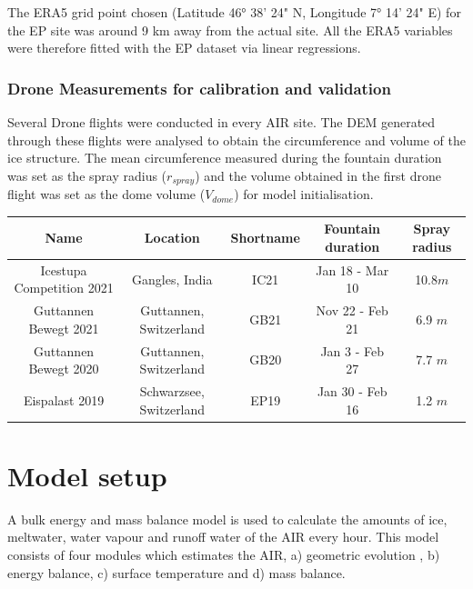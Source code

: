 \documentclass[utf8]{frontiersSCNS} %
\begin{document}
The ERA5 grid point chosen (Latitude 46° 38' 24" N, Longitude 7° 14' 24" E) for the EP site was around 9 km
away from the actual site.  All the ERA5 variables were therefore fitted with the EP dataset via linear regressions.

\subsubsection{Drone Measurements for calibration and validation} \label{section:validation} 
Several Drone flights were conducted in every AIR site. The DEM generated through these flights were analysed to obtain
the circumference and volume of the ice structure. The mean circumference measured during the fountain duration was set
as the spray radius ($r_{spray}$) and the volume obtained in the first drone flight was set as the dome
volume ($V_{dome}$) for model initialisation.

\begin{center}
 \begin{tabular}{|c| c c c c |} 
 \hline
 Name & Location & Shortname & Fountain duration & Spray radius\\ [0.5ex] 
 \hline\hline
 Icestupa Competition 2021 & Gangles, India& IC21 & Jan 18 - Mar 10 & 10.8$m$\\
 \hline
 Guttannen Bewegt 2021 & Guttannen, Switzerland & GB21 & Nov 22 - Feb 21 & 6.9 $m$\\ 
 \hline
 Guttannen Bewegt 2020 & Guttannen, Switzerland& GB20 & Jan 3 - Feb 27 & 7.7 $m$\\ 
 \hline
 Eispalast 2019 & Schwarzsee, Switzerland& EP19 & Jan 30 - Feb 16 & 1.2 $m$\\
 \hline
\end{tabular}
\end{center}

\section{Model setup}

A bulk energy and mass balance model is used to calculate the amounts of ice, meltwater, water vapour and runoff water
of the AIR every hour. This model consists of four modules which estimates the AIR, a) geometric evolution , b) energy
balance, c) surface temperature and d) mass balance. 

\end{document}
